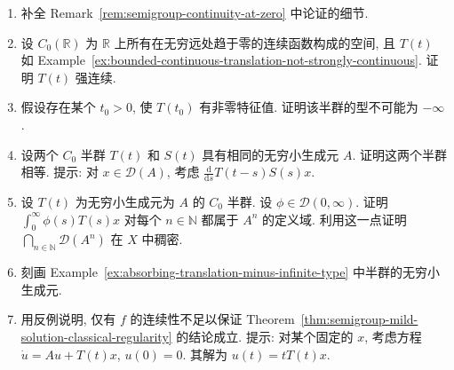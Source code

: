 \begin{enumerate}[label=\thesection.\arabic*.,ref=\thesection.\arabic*,start=2,series=book-problems]

\item\label{ex:semigroup-continuity-at-zero-details} 补全 Remark~\ref{rem:semigroup-continuity-at-zero} 中论证的细节.

\item\label{ex:translation-semigroup-on-vanishing-continuous-functions} 设 $C_0(\mathbb{R})$ 为 $\mathbb{R}$ 上所有在无穷远处趋于零的连续函数构成的空间, 且 $T(t)$ 如 Example~\ref{ex:bounded-continuous-translation-not-strongly-continuous}. 证明 $T(t)$ 强连续.

\item\label{ex:semigroup-nonzero-eigenvalue-finite-type} 假设存在某个 $t_0>0$, 使 $T(t_0)$ 有非零特征值. 证明该半群的型不可能为 $-\infty$.

\item\label{ex:semigroup-generator-determines-semigroup} 设两个 $C_0$ 半群 $T(t)$ 和 $S(t)$ 具有相同的无穷小生成元 $A$. 证明这两个半群相等. 提示: 对 $x\in\mathcal{D}(A)$, 考虑 $\frac{\mathrm{d}}{\mathrm{d}s}T(t-s)S(s)x$.

\item\label{ex:semigroup-smooth-integrated-orbits-dense-powers-domain} 设 $T(t)$ 为无穷小生成元为 $A$ 的 $C_0$ 半群. 设 $\phi\in\mathcal{D}(0,\infty)$. 证明 $\int_0^\infty\phi(s)T(s)x$ 对每个 $n\in\mathbb{N}$ 都属于 $A^n$ 的定义域. 利用这一点证明 $\bigcap_{n\in\mathbb{N}}\mathcal{D}(A^n)$ 在 $X$ 中稠密.

\item\label{ex:absorbing-translation-generator-characterization} 刻画 Example~\ref{ex:absorbing-translation-minus-infinite-type} 中半群的无穷小生成元.

\item\label{ex:continuous-forcing-insufficient-classical-solution} 用反例说明, 仅有 $f$ 的连续性不足以保证 Theorem~\ref{thm:semigroup-mild-solution-classical-regularity} 的结论成立. 提示: 对某个固定的 $x$, 考虑方程 $\dot u=Au+T(t)x$, $u(0)=0$. 其解为 $u(t)=tT(t)x$.

\end{enumerate}
